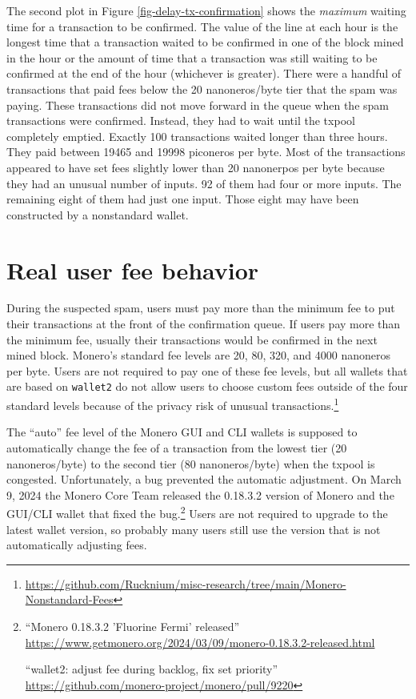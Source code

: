 \documentclass[usletter,11pt,english,openany]{article}
\begin{document}
The second plot in Figure \ref{fig-delay-tx-confirmation} shows the
\textit{maximum} waiting time for a transaction to be confirmed. The
value of the line at each hour is the longest time that a transaction
waited to be confirmed in one of the block mined in the hour or the
amount of time that a transaction was still waiting to be confirmed
at the end of the hour (whichever is greater). There were a handful
of transactions that paid fees below the 20 nanoneros/byte tier that
the spam was paying. These transactions did not move forward in the
queue when the spam transactions were confirmed. Instead, they had
to wait until the txpool completely emptied. Exactly 100 transactions
waited longer than three hours. They paid between 19465 and 19998
piconeros per byte. Most of the transactions appeared to have set
fees slightly lower than 20 nanonerpos per byte because they had an
unusual number of inputs. 92 of them had four or more inputs. The
remaining eight of them had just one input. Those eight may have been
constructed by a nonstandard wallet.

\section{Real user fee behavior}

During the suspected spam, users must pay more than the minimum fee
to put their transactions at the front of the confirmation queue.
If users pay more than the minimum fee, usually their transactions
would be confirmed in the next mined block. Monero's standard fee
levels are 20, 80, 320, and 4000 nanoneros per byte. Users are not
required to pay one of these fee levels, but all wallets that are
based on \texttt{wallet2} do not allow users to choose custom fees
outside of the four standard levels because of the privacy risk of
unusual transactions.\footnote{\url{https://github.com/Rucknium/misc-research/tree/main/Monero-Nonstandard-Fees}}

The ``auto'' fee level of the Monero GUI and CLI wallets is supposed
to automatically change the fee of a transaction from the lowest tier
(20 nanoneros/byte) to the second tier (80 nanoneros/byte) when the
txpool is congested. Unfortunately, a bug prevented the automatic
adjustment. On March 9, 2024 the Monero Core Team released the 0.18.3.2
version of Monero and the GUI/CLI wallet that fixed the bug.\footnote{``Monero 0.18.3.2 'Fluorine Fermi' released'' \url{https://www.getmonero.org/2024/03/09/monero-0.18.3.2-released.html}

``wallet2: adjust fee during backlog, fix set priority'' \url{https://github.com/monero-project/monero/pull/9220}} Users are not required to upgrade to the latest wallet version, so
probably many users still use the version that is not automatically
adjusting fees.
\end{document}
